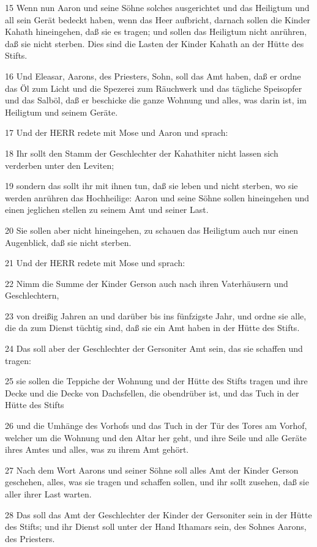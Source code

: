\par 15 Wenn nun Aaron und seine Söhne solches ausgerichtet und das Heiligtum und all sein Gerät bedeckt haben, wenn das Heer aufbricht, darnach sollen die Kinder Kahath hineingehen, daß sie es tragen; und sollen das Heiligtum nicht anrühren, daß sie nicht sterben. Dies sind die Lasten der Kinder Kahath an der Hütte des Stifts.
\par 16 Und Eleasar, Aarons, des Priesters, Sohn, soll das Amt haben, daß er ordne das Öl zum Licht und die Spezerei zum Räuchwerk und das tägliche Speisopfer und das Salböl, daß er beschicke die ganze Wohnung und alles, was darin ist, im Heiligtum und seinem Geräte.
\par 17 Und der HERR redete mit Mose und Aaron und sprach:
\par 18 Ihr sollt den Stamm der Geschlechter der Kahathiter nicht lassen sich verderben unter den Leviten;
\par 19 sondern das sollt ihr mit ihnen tun, daß sie leben und nicht sterben, wo sie werden anrühren das Hochheilige: Aaron und seine Söhne sollen hineingehen und einen jeglichen stellen zu seinem Amt und seiner Last.
\par 20 Sie sollen aber nicht hineingehen, zu schauen das Heiligtum auch nur einen Augenblick, daß sie nicht sterben.
\par 21 Und der HERR redete mit Mose und sprach:
\par 22 Nimm die Summe der Kinder Gerson auch nach ihren Vaterhäusern und Geschlechtern,
\par 23 von dreißig Jahren an und darüber bis ins fünfzigste Jahr, und ordne sie alle, die da zum Dienst tüchtig sind, daß sie ein Amt haben in der Hütte des Stifts.
\par 24 Das soll aber der Geschlechter der Gersoniter Amt sein, das sie schaffen und tragen:
\par 25 sie sollen die Teppiche der Wohnung und der Hütte des Stifts tragen und ihre Decke und die Decke von Dachsfellen, die obendrüber ist, und das Tuch in der Hütte des Stifts
\par 26 und die Umhänge des Vorhofs und das Tuch in der Tür des Tores am Vorhof, welcher um die Wohnung und den Altar her geht, und ihre Seile und alle Geräte ihres Amtes und alles, was zu ihrem Amt gehört.
\par 27 Nach dem Wort Aarons und seiner Söhne soll alles Amt der Kinder Gerson geschehen, alles, was sie tragen und schaffen sollen, und ihr sollt zusehen, daß sie aller ihrer Last warten.
\par 28 Das soll das Amt der Geschlechter der Kinder der Gersoniter sein in der Hütte des Stifts; und ihr Dienst soll unter der Hand Ithamars sein, des Sohnes Aarons, des Priesters.
